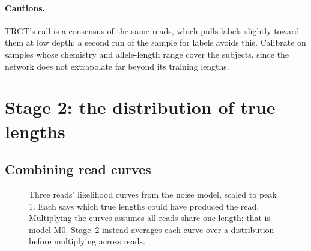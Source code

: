 \documentclass[10pt,a4paper]{article}
\begin{document}
\paragraph{Cautions.} TRGT's call is a consensus of the same reads, which pulls labels slightly toward them at low
depth; a second run of the sample for labels avoids this. Calibrate on samples whose chemistry and allele-length
range cover the subjects, since the network does not extrapolate far beyond its training lengths.

\section{Stage 2: the distribution of true lengths}

\subsection{Combining read curves}

\begin{figure}[H]
\centering
{}
\caption{Three reads' likelihood curves from the noise model, scaled to peak 1. Each says which true lengths could
have produced the read. Multiplying the curves assumes all reads share one length; that is model M0. Stage~2
instead averages each curve over a distribution before multiplying across reads.}
\label{fig:curves}
\end{figure}
\end{document}
